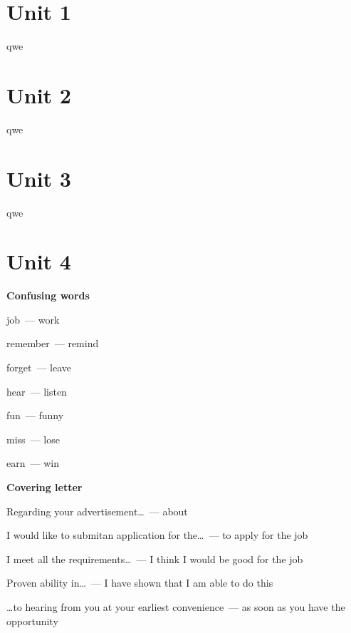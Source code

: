 \documentclass[11pt,a4paper]{article}
\begin{document}
\section{Unit 1}
qwe



\section{Unit 2}
qwe



\section{Unit 3}
qwe



\section{Unit 4}
\textbf{Confusing words}

job~--- work

remember~--- remind

forget~--- leave

hear~--- listen

fun~--- funny

miss~--- lose

earn~--- win

\textbf{Covering letter}

Regarding your advertisement\dots ~--- about

I would like to submitan application for the\dots ~--- to apply for the job

I meet all the requirements\dots ~--- I think I would be good for the job

Proven ability in\dots ~--- I have shown that I am able to do this

\vspace{6pt}\dots to hearing from you at your earliest convenience~--- as soon as you have the opportunity
\end{document}
